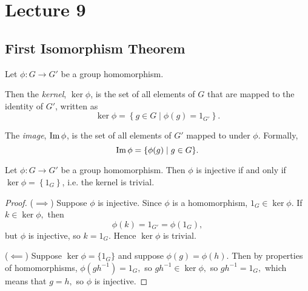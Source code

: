 \section{Lecture 9}
\subsection{First Isomorphism Theorem}

\begin{definition} 
  Let $\phi:G\to G'$ be a group homomorphism. 
  
  Then the \emph{kernel}, $\ker\phi$, is the set of all elements of $G$ that are mapped to the identity of $G'$, written as 
  \[\ker \phi = \left\{ g\in G \mid \phi(g)=1_{G'} \right \}.\]

  The \emph{image}, $\operatorname{Im}\phi$, is the set of all elements of $G'$ mapped to under $\phi$. Formally,
  $$
  \operatorname{Im}\phi = \{\phi(g) \mid g \in G\}.
  $$
  \label{kernel}
\end{definition}

\begin{theorem}
  Let $\phi:G\to G'$ be a group homomorphism. Then $\phi$ is injective if and only if
  $\ker \phi = \left\{ 1_G \right\}$, i.e. the kernel is trivial.
  \label{kernelHomomorphism}
\end{theorem}
\begin{proof}
  ($\implies$) 
  Suppose $\phi$ is injective. Since $\phi$ is a homomorphism, $1_G \in \ker\phi.$
  If $k \in \ker\phi,$ then $$\phi(k) = 1_{G'} = \phi(1_{G}),$$ but $\phi$ is injective, so $k = 1_G$. Hence $\ker\phi$ is trivial.
  

  ($\impliedby$) Suppose $\ker\phi = \{1_G\}$ and suppose $\phi(g) = \phi(h).$ Then by properties of homomorphisms, $\phi(gh^{-1})=1_G,$ so $g h^{-1} \in \ker\phi,$ so $g h^{-1} = 1_G,$ which means that $g=h,$ so $\phi$ is injective.
\end{proof}

